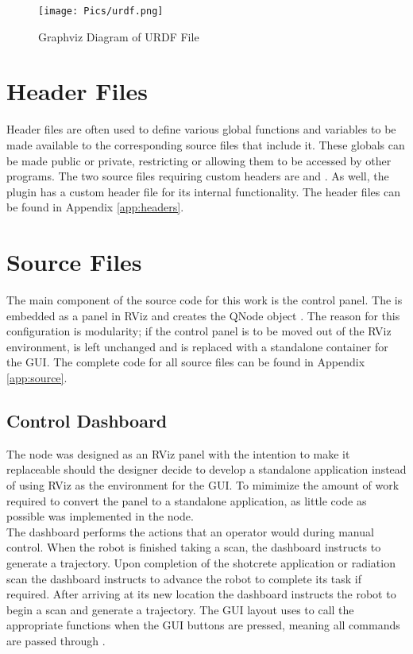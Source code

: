 \begin{figure}[h]
    \centering
    \texttt{[image: Pics/urdf.png]}
    \caption{Graphviz Diagram of URDF File}
    \label{fig:urdf}
\end{figure}

\section{Header Files}
Header files are often used to define various global functions and variables to be made available to the corresponding source files that include it. These globals can be made public or private, restricting or allowing them to be accessed by other programs. The two source files requiring custom headers are  and . As well, the  plugin has a custom header file for its internal functionality. The header files can be found in Appendix \ref{app:headers}.\\

\section{Source Files}
The main component of the source code for this work is the control panel. The  is embedded as a panel in RViz and creates the QNode object . The reason for this configuration is modularity; if the control panel is to be moved out of the RViz environment,  is left unchanged and  is replaced with a standalone container for the GUI. The complete code for all source files can be found in Appendix \ref{app:source}.
\subsection{Control Dashboard}
The  node was designed as an RViz panel with the intention to make it replaceable should the designer decide to develop a standalone application instead of using RViz as the environment for the GUI. To mimimize the amount of work required to convert the panel to a standalone application, as little code as possible was implemented in the node.\\

The dashboard performs the actions that an operator would during manual control. When the robot is finished taking a scan, the dashboard instructs  to generate a trajectory. Upon completion of the shotcrete application or radiation scan the dashboard instructs  to advance the robot to complete its task if required. After arriving at its new location the dashboard instructs the robot to begin a scan and generate a trajectory. The GUI layout uses  to call the appropriate  functions when the GUI buttons are pressed, meaning all commands are passed through .\\
